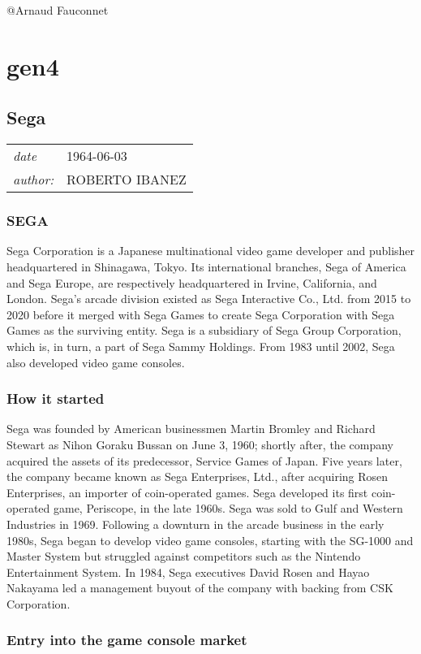 \documentclass[a4paper,10pt]{book}
\newcommand{\pageHeader}[4]{
    \section{#1}
    \vspace{-0.3cm}
    \begin{table}[h!]
     \begin{tabular}{ll}
        \hline
        \textit{date} & #2 \\
        \textit{author: } & #3\\
        \hline
     \end{tabular}
    \end{table}
    \vspace{-0.3cm}
}
\begin{document}
 @Arnaud Fauconnet 
 
 \newpage\chapter{gen4}\newpage\pageHeader{Sega}{1964-06-03}{ROBERTO IBANEZ}{Sega Corporation video game developer}
 \subsection{SEGA }
 
            Sega Corporation is a Japanese multinational video game developer and publisher headquartered in Shinagawa, Tokyo.
             Its international branches, Sega of America and Sega Europe, are respectively headquartered in Irvine, California, and London.
              Sega's arcade division existed as Sega Interactive Co., Ltd. from 2015 to 2020 before it merged with Sega Games to create Sega Corporation with Sega Games as the surviving entity. Sega is a subsidiary of Sega Group Corporation, which is, in turn, a part of Sega Sammy Holdings. From 1983 until 2002, Sega also developed video game consoles.
         
 \subsection{How it started }
 
            Sega was founded by American businessmen Martin Bromley and Richard Stewart as Nihon Goraku Bussan on June 3, 1960; shortly after, the company acquired the assets of its predecessor, Service Games of Japan. 
            Five years later, the company became known as Sega Enterprises, Ltd., after acquiring Rosen Enterprises, an importer of coin-operated games. 
            Sega developed its first coin-operated game, Periscope, in the late 1960s. 
            Sega was sold to Gulf and Western Industries in 1969. Following a downturn in the arcade business in the early 1980s, Sega began to develop video game consoles, starting with the SG-1000 and Master System but struggled against competitors such as the Nintendo Entertainment System. 
            In 1984, Sega executives David Rosen and Hayao Nakayama led a management buyout of the company with backing from CSK Corporation.
         
 \subsection{Entry into the game console market  }
 
\end{document}
